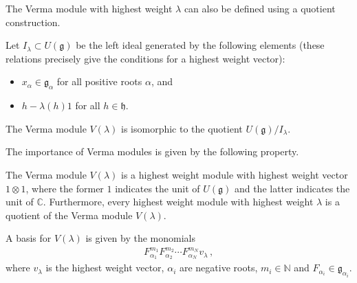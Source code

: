     The Verma module with highest weight $\lambda$ can also be defined using a quotient construction.
    \begin{adefinition}
        Let $I_\lambda\subset U(\mathfrak{g})$ be the left ideal generated by the following elements (these relations precisely give the conditions for a highest weight vector):
        \begin{itemize}
            \item $x_\alpha\in\mathfrak{g_\alpha}$ for all positive roots $\alpha$, and
            \item $h-\lambda(h)1$ for all $h\in\mathfrak{h}$.
        \end{itemize}
        The Verma module $V(\lambda)$ is isomorphic to the quotient $U(\mathfrak{g})/I_\lambda$.
    \end{adefinition}

    The importance of Verma modules is given by the following property.
    \begin{property}
        The Verma module $V(\lambda)$ is a highest weight module with highest weight vector $1\otimes1$, where the former $1$ indicates the unit of $U(\mathfrak{g})$ and the latter indicates the unit of $\mathbb{C}$. Furthermore, every highest weight module with highest weight $\lambda$ is a quotient of the Verma module $V(\lambda)$.
    \end{property}

    \begin{property}
         A basis for $V(\lambda)$ is given by the monomials
         \begin{gather}
             F_{\alpha_1}^{m_1}F_{\alpha_2}^{m_2}\cdots F_{\alpha_N}^{m_N}v_\lambda\,,
         \end{gather}
         where $v_\lambda$ is the highest weight vector, $\alpha_i$ are negative roots, $m_i\in\mathbb{N}$ and $F_{\alpha_i}\in\mathfrak{g}_{\alpha_i}$.
    \end{property}

